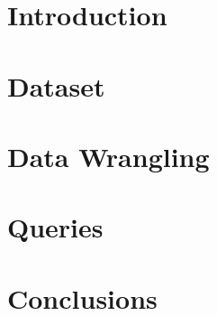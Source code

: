 \documentclass[table, 12pt]{article}
\begin{document}
\clearpage
{{\section{Introduction}}}
\label{sect:introduction}

\clearpage
{{\section{Dataset}}}
\label{sect:dataset}

\clearpage
{{\section{Data Wrangling}}}
\label{sect:wrangling}

\clearpage
{{\section{Queries}}}
\label{sect:queries}

\clearpage
{{\section{Conclusions}}}
\label{sect:conclusions}

\end{document}
